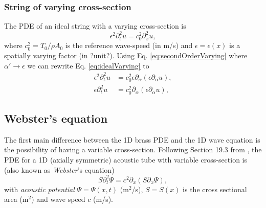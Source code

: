 \documentclass[dvipsnames]{article}
\begin{document}
\subsubsection{String of varying cross-section}
The PDE of an ideal string with a varying cross-section is
\begin{equation}\label{eq:idealVarying}
    \epsilon^2\partial_t^2u=c_0^2\partial^2_xu,
\end{equation}
where $c_0^2 = T_0/\rho A_0$ is the reference wave-speed (in m/s) and $\epsilon = \epsilon(x)$ is a spatially varying factor (in ?unit?). Using Eq. \eqref{eq:secondOrderVarying} where $ \alpha'\rightarrow\epsilon$ we can rewrite Eq. \eqref{eq:idealVarying} to
\begin{align}
    \epsilon^2\partial_t^2u&=c_0^2\epsilon\partial_\alpha(\epsilon\partial_\alpha u),\\
    \epsilon\partial_t^2u&=c_0^2\partial_\alpha(\epsilon\partial_\alpha u),
\end{align}

\subsection{Webster's equation}
The first main difference between the 1D brass PDE and the 1D wave equation is the possibility of having a variable cross-section. Following Section 19.3 from \cite{Bilbao2018}, the PDE for a 1D (axially symmetric) acoustic tube with variable cross-section is (also known as \textit{Webster}'s equation)
\begin{equation}\label{eq:webstersPDE}
    S\partial_t^2\Psi = c^2\partial_x(S\partial_x\Psi),
\end{equation}
with \textit{acoustic potential} $\Psi = \Psi(x,t)$ (m$^2$/s), $S = S(x)$ is the cross sectional area (m$^2$) and wave speed $c$ (m/s).
\end{document}
